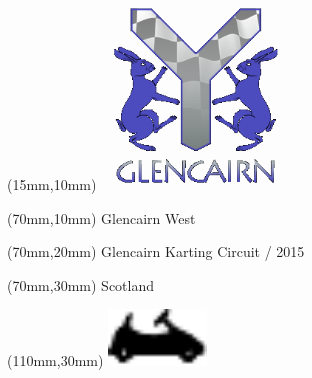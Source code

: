 \null\newpage
\begin{textblock*}{50mm}(15mm,10mm)%
\includegraphics[width=50mm]{LG/GLE.png}
\end{textblock*}
\begin{textblock*}{130mm}(70mm,10mm)%
{\fontsize{20}{20}\selectfont Glencairn West}\\
\end{textblock*}
\begin{textblock*}{120mm}(70mm,20mm)%
{\fontsize{16}{16}\selectfont Glencairn Karting Circuit / 2015}\\
\end{textblock*}
\begin{textblock*}{120mm}(70mm,30mm)%
{\fontsize{12}{12}\selectfont Scotland}
\end{textblock*}
\begin{textblock*}{30mm}(110mm,30mm)%
\centering
\includegraphics[height=15mm]{icons/kart.pdf}
\end{textblock*}
